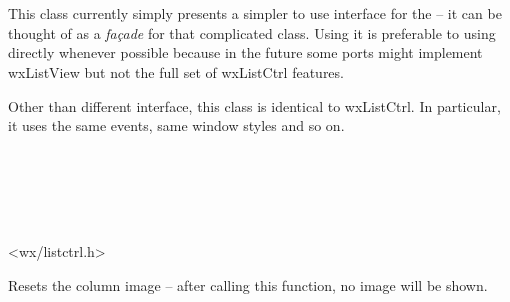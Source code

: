 
\section{}\label{wxlistview}

This class currently simply presents a simpler to use interface for the 
 -- it can be thought of as a {\it fa\c{c}ade}
for that complicated class. Using it is preferable to using 
 directly whenever possible because in the
future some ports might implement wxListView but not the full set of wxListCtrl
features.

Other than different interface, this class is identical to wxListCtrl. In
particular, it uses the same events, same window styles and so on.


\\
\\
\\
\\


<wx/listctrl.h>


\label{wxlistviewclearcolumnimage}


Resets the column image -- after calling this function, no image will be shown.






